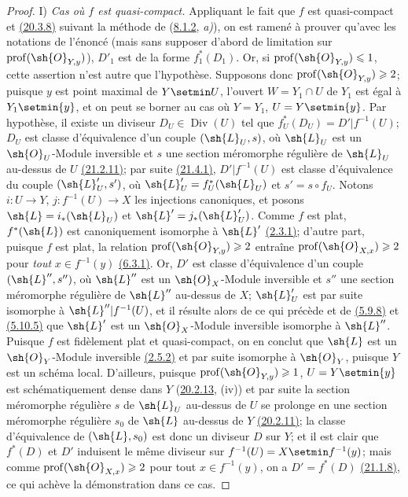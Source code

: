 \begin{proof}
\textup{I)} \emph{Cas où $f$ est quasi-compact.} Appliquant le fait que $f$
est quasi-compact et {\hyperlink{ega4.c04.prop.20-3-8}{(20.3.8)}}
suivant la méthode de ({\hyperref[canon-index.ega4.c04.statement.8-1-2]{8.1.2}},
\emph{a)}), on est ramené à prouver qu'avec les notations de l'énoncé (mais
sans supposer d'abord de limitation sur
$\operatorname{prof}(\sh{O}_{Y,y})$), $D'_1$ est de la forme
$f_1^*(D_1)$. Or, si $\operatorname{prof}(\sh{O}_{Y,y})\leq1$, cette
assertion n'est autre que l'hypothèse. Supposons donc
$\operatorname{prof}(\sh{O}_{Y,y})\geq2$; puisque $y$ est point maximal
de $Y\setmin U$, l'ouvert $W=Y_1\cap U$ de $Y_1$ est égal à $Y_1\setmin\{y\}$, et
on peut se borner au cas où $Y=Y_1$, $U=Y\setmin\{y\}$. Par hypothèse, il
existe un diviseur $D_U\in\operatorname{Div}(U)$ tel que
$f_U^*(D_U)=D'|f^{-1}(U)$; $D_U$ est classe d'équivalence d'un couple
$(\sh{L}_U,s)$, où $\sh{L}_U$ est un $\sh{O}_U$-Module inversible et
$s$ une section méromorphe régulière de $\sh{L}_U$ au-dessus de $U$
{\hyperlink{ega4.c04.prop.21-2-11}{(21.2.11)}}; par suite
{\hyperlink{ega4.c04.statement.21-4-1}{(21.4.1)}},
$D'|f^{-1}(U)$ est classe d'équivalence du couple
$(\sh{L}'_U,s')$, où
$\sh{L}'_U=f_U^*(\sh{L}_U)$ et $s'=s\circ f_U$.
Notons $i:U\to Y$, $j:f^{-1}(U)\to X$ les injections canoniques, et
posons
$\sh{L}=i_*(\sh{L}_U)$ et
$\sh{L}'=j_*(\sh{L}'_U)$.
Comme $f$ est plat, $f^*(\sh{L})$ est canoniquement isomorphe à
$\sh{L}'$ {\hyperref[canon-index.ega4.c04.lem.2-3-1]{(2.3.1)}}; d'autre part,
puisque $f$ est plat, la relation
$\operatorname{prof}(\sh{O}_{Y,y})\geq2$ entraîne
$\operatorname{prof}(\sh{O}_{X,x})\geq2$ pour \emph{tout} $x\in f^{-1}(y)$
{\hyperref[canon-index.ega4.c04.prop.6-3-1]{(6.3.1)}}.
Or, $D'$ est classe d'équivalence d'un couple $(\sh{L}'',s'')$, où
$\sh{L}''$ est un $\sh{O}_X$-Module inversible et $s''$ une section
méromorphe régulière de $\sh{L}''$ au-dessus de $X$; $\sh{L}'_U$ est
par suite isomorphe à $\sh{L}''|f^{-1}(U)$, et il résulte alors de ce
qui précède et de {\hyperref[canon-index.ega4.c04.prop.5-9-8]{(5.9.8)}} et
{\hyperref[canon-index.ega4.c04.thm.5-10-5]{(5.10.5)}} que $\sh{L}'$ est un
$\sh{O}_X$-Module inversible isomorphe à $\sh{L}''$. Puisque $f$ est
fidèlement plat et quasi-compact, on en conclut que $\sh{L}$ est un
$\sh{O}_Y$-Module inversible
{\hyperref[canon-index.ega4.c04.prop.2-5-2]{(2.5.2)}} et par suite isomorphe à
$\sh{O}_Y$, puisque $Y$ est un schéma local. D'ailleurs, puisque
$\operatorname{prof}(\sh{O}_{Y,y})\geq1$, $U=Y\setmin\{y\}$ est
schématiquement dense dans $Y$
({\hyperlink{ega4.c04.statement.20-2-13}{20.2.13}}, (iv)) et par suite
la section méromorphe régulière $s$ de $\sh{L}_U$ au-dessus de $U$ se
prolonge en une section méromorphe régulière $s_0$ de $\sh{L}$
au-dessus de $Y$ {\hyperlink{ega4.c04.prop.20-2-11}{(20.2.11)}}; la
classe d'équivalence de $(\sh{L},s_0)$ est donc un diviseur $D$ sur
$Y$; et il est clair que $f^*(D)$ et $D'$ induisent le même diviseur sur
$f^{-1}(U)=X\setmin f^{-1}(y)$; mais comme
$\operatorname{prof}(\sh{O}_{X,x})\geq2$ pour tout $x\in f^{-1}(y)$,
on a $D'=f^*(D)$ {\hyperlink{ega4.c04.prop.21-1-8}{(21.1.8)}}, ce qui
achève la démonstration dans ce cas.


\end{proof}
